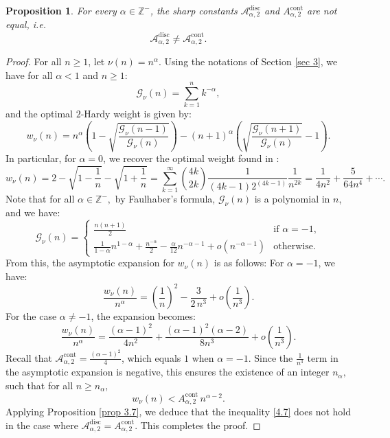 \documentclass[11pt]{amsart}
\newtheorem{prop}[thm]{Proposition}
\newcommand{\1}{[1]}
\begin{document}
\begin{prop} \label{prop 4.10} For every $\alpha \in \mathbb{Z}^{-}$, the sharp constants $\mathcal{A}_{\alpha,2}^{\text{disc}}$ and $A_{\alpha,2}^{\text{cont}}$ are not equal, i.e. $$\mathcal{A}_{\alpha,2}^{\text{disc}} \neq \mathcal{A}_{\alpha,2}^{\text{cont}}.$$
\end{prop}
\begin{proof}
For all $n \geq 1$, let $\nu(n) = n^{\alpha}$. Using the notations of Section \ref{sec 3}, we have for all $\alpha < 1$ and $n \geq 1$:  
\[
\mathcal{G}_{\nu}(n) = \sum_{k=1}^{n} k^{-\alpha},  
\]  
and the optimal $2$-Hardy weight is given by:  
$$
w_{\nu}(n) = n^{\alpha} \left( 1 - \sqrt{ \frac{\mathcal{G}_{\nu}(n-1)}{\mathcal{G}_{\nu}(n)} } \right) - (n+1)^{\alpha} \left( \sqrt{ \frac{\mathcal{G}_{\nu}(n+1)}{\mathcal{G}_{\nu}(n)} } - 1 \right).
$$
In particular, for $\alpha = 0$, we recover the optimal weight found in \cite{KPP18}:  
$$
w_{\nu}(n) = 2 - \sqrt{1 - \frac{1}{n}} - \sqrt{1 + \frac{1}{n}} = \sum_{k=1}^{\infty} \binom{4k}{2k} \frac{1}{(4k-1)2^{(4k-1)}} \frac{1}{n^{2k}} = \frac{1}{4n^{2}} + \frac{5}{64n^{4}} + \cdots.
$$
Note that for all $\alpha \in \mathbb{Z}^{-},$ by Faulhaber’s formula, $\mathcal{G}_{\nu}(n)$ is a polynomial in $n$, and we have:  
\[
\mathcal{G}_{\nu}(n) =  
\begin{cases} 
\displaystyle \frac{n(n+1)}{2} & \text{if } \alpha = -1, \\ 
\displaystyle \frac{1}{1-\alpha} n^{1-\alpha} + \frac{n^{-\alpha}}{2} - \frac{\alpha}{12} n^{-\alpha-1} + o(n^{-\alpha-1}) & \text{otherwise}. 
\end{cases}
\]
From this, the asymptotic expansion for $w_{\nu}(n)$ is as follows: 
For $\alpha = -1$, we have:  
\[
\frac{w_{\nu}(n)}{n^{\alpha}} = \left(\frac{1}{n}\right)^{2} - \frac{3}{2 \, n^{3}} + o\left(\frac{1}{n^3}\right).  
\]  
For the case $\alpha \neq -1$, the expansion becomes:
$$
\frac{w_{\nu}(n)}{n^{\alpha}} = \frac{(\alpha - 1)^2}{4n^2} + \frac{(\alpha - 1)^2 (\alpha - 2)}{8n^3} + o\left(\frac{1}{n^3}\right).
$$
Recall that $\mathcal{A}_{\alpha,2}^{\text{cont}} = \frac{(\alpha - 1)^2}{4}$, which equals $1$ when $\alpha = -1$. Since the $\frac{1}{n^3}$ term in the asymptotic expansion is negative, this ensures the existence of an integer $n_{\alpha},$ such that for all $n \geq n_{\alpha}$,  
\[
w_{\nu}(n) < A_{\alpha,2}^{\text{cont}} \, n^{\alpha - 2}.  
\]  
Applying Proposition \ref{prop 3.7}, we deduce that the inequality \eqref{4.7} does not hold in the case where $\mathcal{A}_{\alpha,2}^{\text{disc}} = A_{\alpha,2}^{\text{cont}}$. This completes the proof.
\end{proof}
\end{document}

